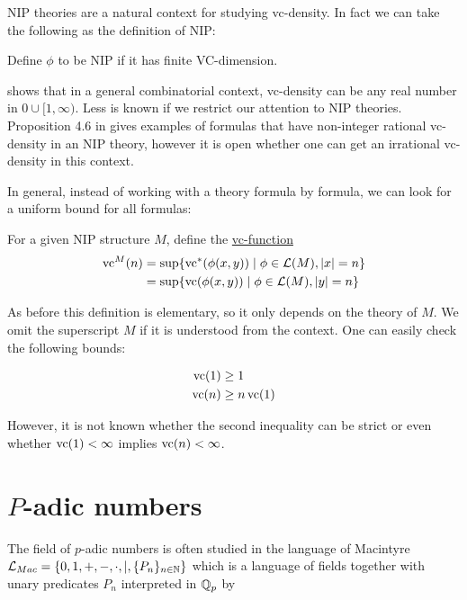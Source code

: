 \documentclass{amsart}
\renewcommand{\LL}{\mathcal L}
\newcommand{\LLM}{\mathcal L_{Mac}}
\newcommand{\curly}[1]{\left\{#1\right\}}
\newcommand{\defn}{\underline}
\begin{document}
NIP theories are a natural context for studying vc-density.
In fact we can take the following as the definition of NIP:
\begin{Definition}
  Define $\phi$ to be NIP if it has finite VC-dimension. 
\end{Definition}

\cite{Aschenbrenner_reference_8} shows that in a general combinatorial context,
vc-density can be any real number in $0 \cup [1, \infty)$.
Less is known if we restrict our attention to NIP theories.
Proposition 4.6 in \cite{density} gives examples of formulas that have non-integer rational vc-density in an NIP theory,
however it is open whether one can get an irrational vc-density in this context.

In general, instead of working with a theory formula by formula, we can look for a uniform bound for all formulas:
\begin{Definition}
  For a given NIP structure $M$, define the \defn{vc-function}
  \begin{align*}
    \vc^M(n) &= \sup \{\vc^*(\phi(x, y)) \mid \phi \in \LL(M), |x| = n\} \\
             &= \sup \{\vc(\phi(x, y)) \mid \phi \in \LL(M), |y| = n\}
  \end{align*}
\end{Definition}

As before this definition is elementary, so it only depends on the theory of $M$.
We omit the superscript $M$ if it is understood from the context.
One can easily check the following bounds:
\begin{Lemma} 
  \begin{align*}
    \operatorname{vc}(1) &\geq 1 \\
    \operatorname{vc}(n) &\geq n\operatorname{vc}(1)
  \end{align*}  
\end{Lemma}

However, it is not known whether the second inequality can be strict or even whether $\operatorname{vc}(1) < \infty$ implies $\operatorname{vc}(n) < \infty$.


\section{$P$-adic numbers}


The field of $p$-adic numbers is often studied in the language of Macintyre $\LLM = \curly{0, 1, +, -, \cdot, |, \{P_n\}_{n \in \N}}$
which is a language of fields together with unary predicates $P_n$ interpreted in $\mathbb{Q}_p$ by
\end{document}
